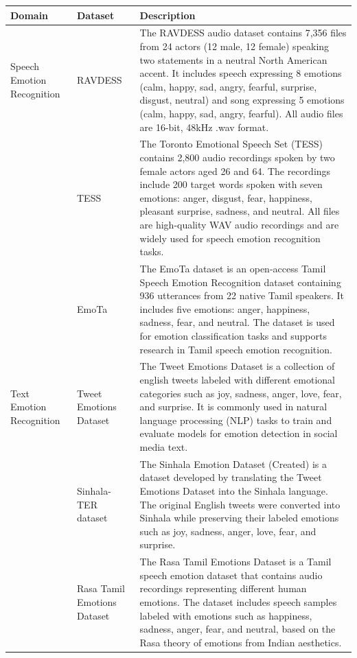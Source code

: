 \begin{table}[H]
\centering
\begin{tabular}{|>{\RaggedRight}p{}|>{\RaggedRight}p{}|>{\RaggedRight}p{}|}
\hline
Domain & Dataset & Description \\ \hline
Speech Emotion Recognition & RAVDESS & The RAVDESS audio dataset contains 7,356 files from 24 actors (12 male, 12 female) speaking two statements in a neutral North American accent. It includes speech expressing 8 emotions (calm, happy, sad, angry, fearful, surprise, disgust, neutral) and song expressing 5 emotions (calm, happy, sad, angry, fearful). All audio files are 16-bit, 48kHz .wav format. \\ \hline
& TESS & The Toronto Emotional Speech Set (TESS) contains 2,800 audio recordings spoken by two female actors aged 26 and 64. The recordings include 200 target words spoken with seven emotions: anger, disgust, fear, happiness, pleasant surprise, sadness, and neutral. All files are high-quality WAV audio recordings and are widely used for speech emotion recognition tasks. \\ \hline
& EmoTa & The EmoTa dataset is an open-access Tamil Speech Emotion Recognition dataset containing 936 utterances from 22 native Tamil speakers. It includes five emotions: anger, happiness, sadness, fear, and neutral. The dataset is used for emotion classification tasks and supports research in Tamil speech emotion recognition. \\ \hline
Text Emotion Recognition & Tweet Emotions Dataset & The Tweet Emotions Dataset is a collection of english tweets labeled with different emotional categories such as joy, sadness, anger, love, fear, and surprise. It is commonly used in natural language processing (NLP) tasks to train and evaluate models for emotion detection in social media text. \\ \hline
& Sinhala-TER dataset & The Sinhala Emotion Dataset (Created) is a dataset developed by translating the Tweet Emotions Dataset into the Sinhala language. The original English tweets were converted into Sinhala while preserving their labeled emotions such as joy, sadness, anger, love, fear, and surprise. \\ \hline
& Rasa Tamil Emotions Dataset & The Rasa Tamil Emotions Dataset is a Tamil speech emotion dataset that contains audio recordings representing different human emotions. The dataset includes speech samples labeled with emotions such as happiness, sadness, anger, fear, and neutral, based on the Rasa theory of emotions from Indian aesthetics. \\ \hline

\end{tabular}
\end{table}
